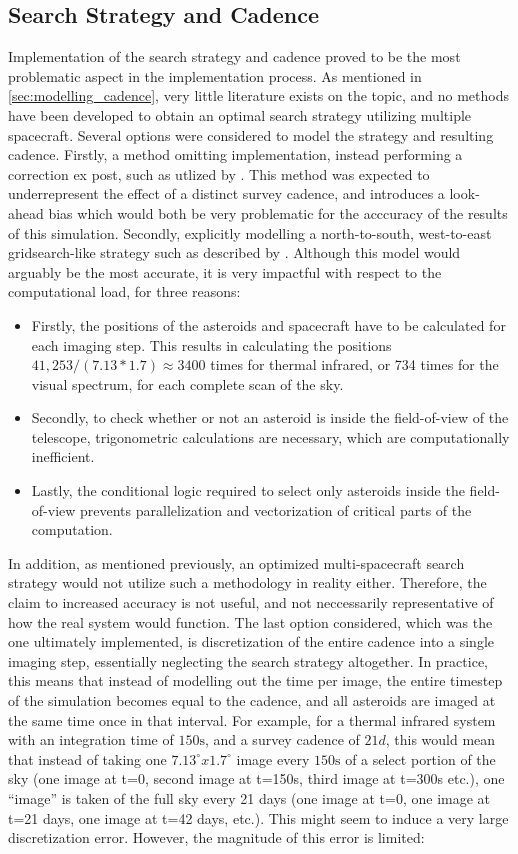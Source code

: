 \subsection{Search Strategy and Cadence}
Implementation of the search strategy and cadence proved to be the most problematic aspect in the implementation process. As mentioned in \autoref{sec:modelling_cadence}, very little literature exists on the topic, and no methods have been developed to obtain an optimal search strategy utilizing multiple spacecraft. Several options were considered to model the strategy and resulting cadence. Firstly, a method omitting implementation, instead performing a correction ex post, such as utlized by \cite{ThesisOlga}. This method was expected to underrepresent the effect of a distinct survey cadence, and introduces a look-ahead bias which would both be very problematic for the acccuracy of the results of this simulation. Secondly, explicitly modelling a north-to-south, west-to-east gridsearch-like strategy such as described by \cite{NEOCam}. Although this model would arguably be the most accurate, it is very impactful with respect to the computational load, for three reasons:
\begin{itemize}
 \item Firstly, the positions of the asteroids and spacecraft have to be calculated for each imaging step. This results in calculating the positions $41,253 / (7.13*1.7) \approx 3400$ times for thermal infrared, or 734 times for the visual spectrum, for each complete scan of the sky.
 \item Secondly, to check whether or not an asteroid is inside the field-of-view of the telescope, trigonometric calculations are necessary, which are computationally inefficient.
 \item Lastly, the conditional logic required to select only asteroids inside the field-of-view prevents parallelization and vectorization of critical parts of the computation.
\end{itemize}
In addition, as mentioned previously, an optimized multi-spacecraft search strategy would not utilize such a methodology in reality either. Therefore, the claim to increased accuracy is not useful, and not neccessarily representative of how the real system would function. The last option considered, which was the one ultimately implemented, is discretization of the entire cadence into a single imaging step, essentially neglecting the search strategy altogether. In practice, this means that instead of modelling out the time per image, the entire timestep of the simulation becomes equal to the cadence, and all asteroids are imaged at the same time once in that interval. For example, for a thermal infrared system with an integration time of $150\mathrm{s}$, and a survey cadence of $21d$, this would mean that instead of taking one $7.13^\circ x1.7^\circ$ image every $150\mathrm{s}$ of a select portion of the sky (one image at t=0, second image at t=150s, third image at t=300s etc.), one ``image'' is taken of the full sky every 21 days (one image at t=0, one image at t=21 days, one image at t=42 days, etc.). This might seem to induce a very large discretization error. However, the magnitude of this error is limited:
